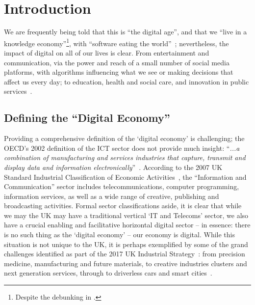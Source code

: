 \documentclass[sigconf,anonymous]{acmart}
\begin{document}
\section{Introduction}


We are frequently being told that this is ``the digital age'', and
that we ``live in a knowledge economy''\footnote{Despite the debunking
in \cite{Friesen2008}.}, with ``software eating the
world''~\cite{andreessen:2011}; nevertheless, the impact of digital on all of our
lives is clear. From entertainment and communication, via the power
and reach of a small number of social media platforms, with algorithms
influencing what we see or making decisions that affect us every day;
to education, health and social care, and innovation in public
services~\cite{ecdsmsuk:2018}.

\subsection{Defining the ``Digital Economy''}

Providing a comprehensive definition of the `digital economy' is
challenging; the OECD's 2002 definition of the ICT sector does not
provide much insight: ``{\emph{...a combination of manufacturing and
services industries that capture, transmit and display data and
information electronically}}''~\cite{oecd:2002}. According to the 2007
UK Standard Industrial Classification of Economic
Activities~\cite{onssic:2009}, the ``Information and Communication''
sector includes telecommunications, computer programming, information
services, as well as a wide range of creative, publishing and
broadcasting activities. Formal sector classifications aside, it is
clear that while we may the UK may have a traditional vertical `IT and
Telecoms' sector, we also have a crucial enabling and facilitative
horizontal digital sector -- in essence: there is no such thing as the
`digital economy' -- our economy is digital. While this situation is
not unique to the UK, it is perhaps exemplified by some of the grand
challenges identified as part of the 2017 UK Industrial
Strategy~\cite{ukis:2017}: from precision medicine, manufacturing and
future materials, to creative industries clusters and next generation
services, through to driverless cars and smart
cities~\cite{tryfonas+crick:petra2018}.
\end{document}
